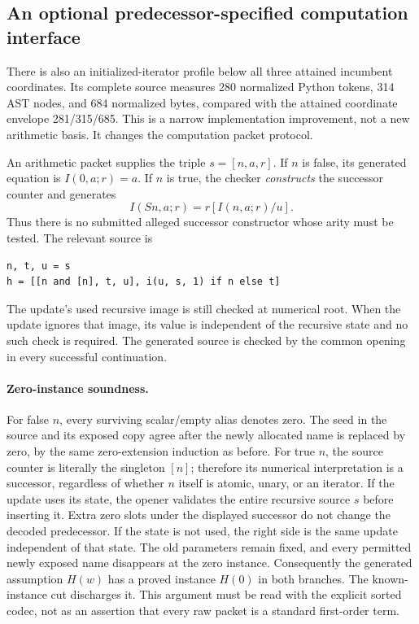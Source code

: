 \subsection{An optional predecessor-specified computation interface}

There is also an initialized-iterator profile below all three attained
incumbent coordinates. Its complete source measures 280 normalized Python
tokens, 314 AST nodes, and 684 normalized bytes, compared with the attained
coordinate envelope 281/315/685. This is a narrow implementation improvement,
not a new arithmetic basis. It changes the computation packet protocol.

An arithmetic packet supplies the triple $s=[n,a,r]$. If $n$ is false,
its generated equation is $I(0,a;r)=a$. If $n$ is true, the checker
\emph{constructs} the successor counter and generates
\[
       I(Sn,a;r)=r[I(n,a;r)/u].
\]
Thus there is no submitted alleged successor constructor whose arity must
be tested. The relevant source is
\begin{verbatim}
n, t, u = s
h = [[n and [n], t, u], i(u, s, 1) if n else t]
\end{verbatim}
The update's used recursive image is still checked at numerical root.
When the update ignores that image, its value is independent of the
recursive state and no such check is required. The generated source is
checked by the common opening in every successful continuation.

\paragraph{Zero-instance soundness.}
For false $n$, every surviving scalar/empty alias denotes zero. The seed
in the source and its exposed copy agree after the newly allocated name
is replaced by zero, by the same zero-extension induction as before.
For true $n$, the source counter is literally the singleton $[n]$;
therefore its numerical interpretation is a successor, regardless of
whether $n$ itself is atomic, unary, or an iterator. If the update uses
its state, the opener validates the entire recursive source $s$ before
inserting it. Extra zero slots under the displayed successor do not
change the decoded predecessor. If the state is not used, the right side
is the same update independent of that state. The old parameters remain
fixed, and every permitted newly exposed name disappears at the zero
instance. Consequently the generated assumption $H(w)$ has a proved
instance $H(0)$ in both branches. The known-instance cut discharges it.
This argument must be read with the explicit sorted codec, not as an
assertion that every raw packet is a standard first-order term.

